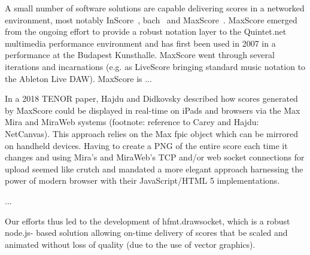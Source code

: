 
A small number of software solutions are capable delivering scores in a networked environment, most notably InScore~\cite{fober2013programming}, bach~\cite{agostini2015max} and MaxScore~\cite{didkovsky2008maxscore}. MaxScore emerged from the ongoing effort to provide a robust notation layer to the Quintet.net multimedia performance environment and has first been used in 2007 in a performance at the Budapest Kunsthalle. MaxScore went through several iterations and incarnations (e.g. as LiveScore bringing standard music notation to the Ableton Live DAW).
MaxScore is ...

In a 2018 TENOR paper, Hajdu and Didkovsky described how scores generated by MaxScore could be displayed in real-time on iPads and browsers via the Max Mira and MiraWeb systems (footnote: reference to Carey and Hajdu: NetCanvas). This approach relies on the Max fpic object which can be mirrored on handheld devices. Having to create a PNG of the entire score each time it changes and using Mira’s and MiraWeb’s TCP and/or web socket connections for upload seemed like crutch and mandated a more elegant approach harnessing the power of modern browser with their JavaScript/HTML 5 implementations. 

...

Our efforts thus led to the development of hfmt.drawsocket, which is a robust node.js- based solution allowing on-time delivery of scores that be scaled and animated without loss of quality (due to the use of vector graphics).





